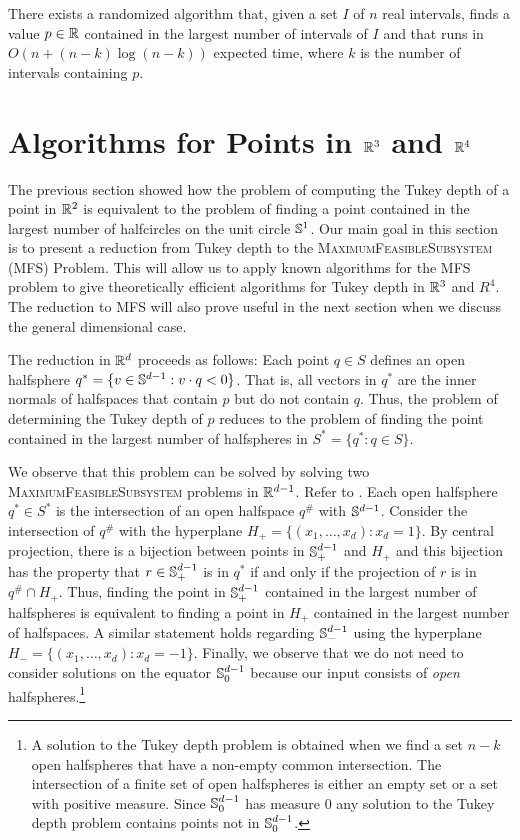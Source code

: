\documentclass[charterfonts,lotsofwhite]{patmorin}
\begin{document}
\begin{thm}
There exists a randomized algorithm that, given a set $I$ of $n$ real
intervals, finds a value $p\in\mathbb{R}$ contained in the largest number of
intervals of $I$ and that runs in $O(n+(n-k)\log (n-k))$ expected
time, where $k$ is the number of intervals containing $p$.
\end{thm}


\section{Algorithms for Points in $\mathbb{R}^3$ and $\mathbb{R}^4$}

The previous section showed how the problem of computing the Tukey
depth of a point in $\mathbb{R}^2$ is equivalent to the problem of finding a
point contained in the largest number of halfcircles on the unit
circle $\mathbb{S}^1$.  Our main goal in this section is to present a
reduction from Tukey depth to the \textsc{MaximumFeasibleSubsystem}
(MFS) Problem. This will allow us to apply known algorithms for the
MFS problem to give theoretically efficient algorithms for Tukey depth
in $\mathbb{R}^3$ and $R^4$. The reduction to MFS will also prove useful in the next
section when we discuss the general dimensional case.

The reduction in $\mathbb{R}^d$ proceeds as follows:  Each point $q\in S$
defines an open halfsphere $q^*=\{ v\in\mathbb{S}^{d-1} : v\cdot q < 0\}$.
That is, all vectors in $q^*$ are the inner normals of halfspaces that
contain $p$ but do not contain $q$.  Thus, the problem of determining
the Tukey depth of $p$ reduces to the problem of finding the point
contained in the largest number of halfspheres in $S^*=\{q^* : q\in
S\}$.

We observe that this problem can be solved by solving two
\textsc{MaximumFeasibleSubsystem} problems in $\mathbb{R}^{d-1}$. Refer to
.  Each open halfsphere $q^*\in S^*$ is the
intersection of an open halfspace $q^\#$ with $\mathbb{S}^{d-1}$.  Consider
the intersection of $q^\#$ with the hyperplane
$H_+=\{(x_1,\ldots,x_d):x_d=1\}$.  By central projection, there is a
bijection between points in $\mathbb{S}^{d-1}_+$ and $H_+$ and this bijection
has the property that $r\in\mathbb{S}^{d-1}_+$ is in $q^*$ if and only if the
projection of $r$ is in $q^\#\cap H_+$.  Thus, finding the point in
$\mathbb{S}^{d-1}_+$ contained in the largest number of halfspheres is
equivalent to finding a point in $H_+$ contained in the largest number
of halfspaces.  A similar statement holds regarding $\mathbb{S}^{d-1}_-$
using the hyperplane $H_-=\{(x_1,\ldots,x_d):x_d=-1\}$.  Finally, we
observe that we do not need to consider solutions on the equator
$\mathbb{S}^{d-1}_0$ because our input consists of \emph{open}
halfspheres.\footnote{A solution to the Tukey depth problem is
obtained when we find a set $n-k$ open halfspheres that have a
non-empty common intersection.  The intersection of a finite set of
open halfspheres is either an empty set or a set with positive
measure.  Since $\mathbb{S}^{d-1}_0$ has measure 0 any solution to the Tukey
depth problem contains points not in $\mathbb{S}^{d-1}_0$.}
\end{document}
